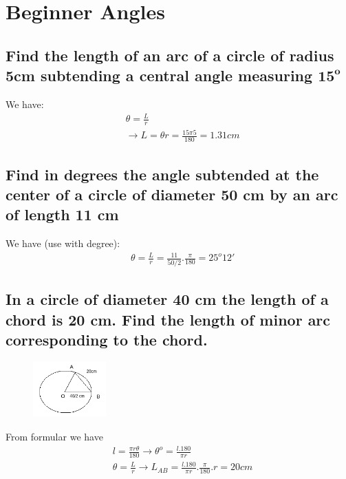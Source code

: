 \documentclass{article}
\begin{document}
\tableofcontents

\newpage
\section{Beginner Angles}
\begin{multicols}{2}

\subsection{Find the length of an arc of a circle of radius 5cm subtending a central angle measuring $\mathbf{15^o}$}
We have:
\begin{align*}
    &\theta = \frac{L}{r} \\
    &\rightarrow L = \theta r = \frac{15\pi 5}{180} = 1.31 cm
\end{align*}

\subsection{Find in degrees the angle subtended at the center of a circle of diameter 50 cm by an arc of length 11 cm}
We have (use with degree):
\begin{align*}
    &\theta = \frac{L}{r} = \frac{11}{50/2}.\frac{\pi}{180} = 25^o12'
\end{align*}

\subsection{In a circle of diameter 40 cm the length of a chord is 20 cm. Find the length of minor arc corresponding to the chord.}

\begin{figure}[H]
    \centering
    \includegraphics[width=0.25\textwidth]{begin-angles6.png}
\end{figure}

From formular we have
\begin{align*}
    &l = \frac{\pi r \theta}{180} \rightarrow \theta^o= \frac{l.180}{\pi r} \\
    &\theta = \frac{L}{r} \rightarrow L_{AB} = \frac{l.180}{\pi r}.\frac{\pi}{180}.r = 20cm
\end{align*}



\end{multicols}
\end{document}
